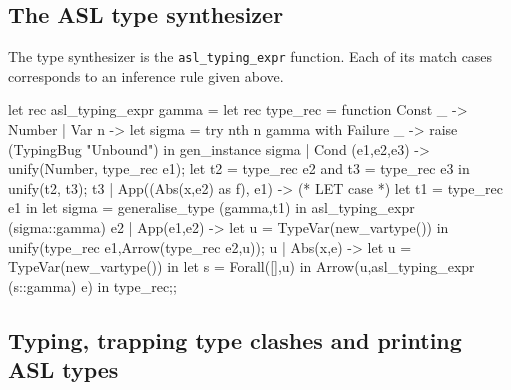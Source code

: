 \subsection{The ASL type synthesizer}
%

The type synthesizer is the \verb"asl_typing_expr" function. Each of its
match cases corresponds to an inference rule given above.
\begin{caml_example}
let rec asl_typing_expr gamma =
  let rec type_rec = function
      Const _ -> Number
    | Var n ->
        let sigma =
          try nth n gamma
          with Failure _ -> raise (TypingBug "Unbound")
        in gen_instance sigma
    | Cond (e1,e2,e3) ->
        unify(Number, type_rec e1);
        let t2 = type_rec e2 and t3 = type_rec e3
        in unify(t2, t3); t3
    | App((Abs(x,e2) as f), e1) -> (* LET case *)
        let t1 = type_rec e1 in
          let sigma = generalise_type (gamma,t1)
        in asl_typing_expr (sigma::gamma) e2
    | App(e1,e2) ->
        let u = TypeVar(new_vartype())
        in unify(type_rec e1,Arrow(type_rec e2,u)); u
    | Abs(x,e) ->
        let u = TypeVar(new_vartype()) in
        let s = Forall([],u)
        in Arrow(u,asl_typing_expr (s::gamma) e)
  in type_rec;;
\end{caml_example}

\subsection{Typing, trapping type clashes and printing ASL types}
%

